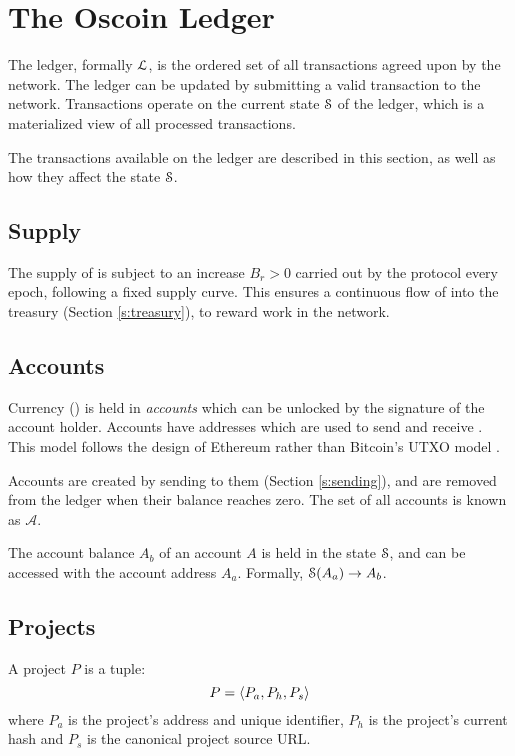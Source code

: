 \section{The Oscoin Ledger}
\label{s:ledger}

The \oscoin{} ledger, formally $\mathcal{L}$, is the ordered set of all
transactions agreed upon by the network. The ledger can be updated by submitting
a valid transaction to the network. Transactions operate on the current state
$\mathcal{S}$ of the ledger, which is a materialized view of all processed transactions.

The transactions available on the ledger are described in this section, as well
as how they affect the state $\mathcal{S}$.

\subsection{Supply}

The supply of \oscoin{} is subject to an increase $B_r > 0$ carried out by the
protocol every epoch, following a fixed supply curve. This ensures a continuous
flow of \oscoin{} into the treasury (Section \ref{s:treasury}), to reward work
in the network.

\subsection{Accounts}
\label{s:accounts}

Currency (\oscoin{}) is held in \emph{accounts} which can be unlocked by the
signature of the account holder. Accounts have addresses which are used to send
and receive \oscoin{}. This model follows the design of Ethereum \cite{ethereum}
rather than Bitcoin's UTXO model \cite{bitcoin}.

Accounts are created by sending \oscoin{} to them (Section \ref{s:sending}),
and are removed from the ledger when their balance reaches zero. The set of all
accounts is known as $\mathcal{A}$.

The account balance $A_b$ of an account $A$ is held in the state $\mathcal{S}$, and
can be accessed with the account address $A_a$. Formally, $\mathcal{S}(A_a) \to A_b$.

\subsection{Projects}
\label{s:projects}

A project $P$ is a tuple:
\[
    P = \langle P_a, P_h, P_s\rangle
\]
where $P_{a}$ is the project's address and unique identifier, $P_h$ is
the project's current hash and $P_s$ is the canonical project source
URL.

